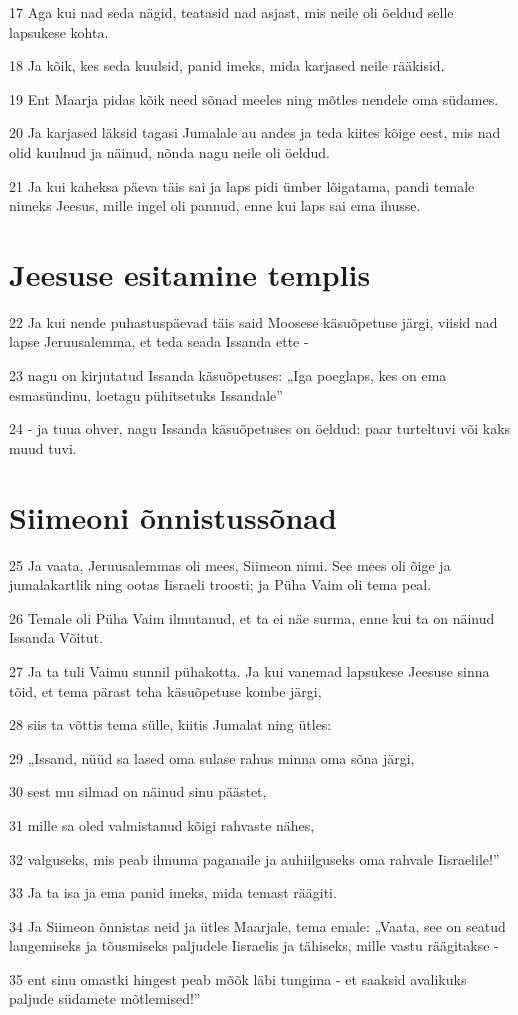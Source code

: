 \par 17 Aga kui nad seda nägid, teatasid nad asjast, mis neile oli öeldud selle lapsukese kohta.
\par 18 Ja kõik, kes seda kuulsid, panid imeks, mida karjased neile rääkisid.
\par 19 Ent Maarja pidas kõik need sõnad meeles ning mõtles nendele oma südames.
\par 20 Ja karjased läksid tagasi Jumalale au andes ja teda kiites kõige eest, mis nad olid kuulnud ja näinud, nõnda nagu neile oli öeldud.
\par 21 Ja kui kaheksa päeva täis sai ja laps pidi ümber lõigatama, pandi temale nimeks Jeesus, mille ingel oli pannud, enne kui laps sai ema ihusse.

\section*{Jeesuse esitamine templis}

\par 22 Ja kui nende puhastuspäevad täis said Moosese käsuõpetuse järgi, viisid nad lapse Jeruusalemma, et teda seada Issanda ette -
\par 23 nagu on kirjutatud Issanda käsuõpetuses: „Iga poeglaps, kes on ema esmasündinu, loetagu pühitsetuks Issandale”
\par 24 - ja tuua ohver, nagu Issanda käsuõpetuses on öeldud: paar turteltuvi või kaks muud tuvi.

\section*{Siimeoni õnnistussõnad}

\par 25 Ja vaata, Jeruusalemmas oli mees, Siimeon nimi. See mees oli õige ja jumalakartlik ning ootas Iisraeli troosti; ja Püha Vaim oli tema peal.
\par 26 Temale oli Püha Vaim ilmutanud, et ta ei näe surma, enne kui ta on näinud Issanda Võitut.
\par 27 Ja ta tuli Vaimu sunnil pühakotta. Ja kui vanemad lapsukese Jeesuse sinna tõid, et tema pärast teha käsuõpetuse kombe järgi,
\par 28 siis ta võttis tema sülle, kiitis Jumalat ning ütles:
\par 29 „Issand, nüüd sa lased oma sulase rahus minna oma sõna järgi,
\par 30 sest mu silmad on näinud sinu päästet,
\par 31 mille sa oled valmistanud kõigi rahvaste nähes,
\par 32 valguseks, mis peab ilmuma paganaile ja auhiilguseks oma rahvale Iisraelile!”
\par 33 Ja ta isa ja ema panid imeks, mida temast räägiti.
\par 34 Ja Siimeon õnnistas neid ja ütles Maarjale, tema emale: „Vaata, see on seatud langemiseks ja tõusmiseks paljudele Iisraelis ja tähiseks, mille vastu räägitakse -
\par 35 ent sinu omastki hingest peab mõõk läbi tungima - et saaksid avalikuks paljude südamete mõtlemised!”

